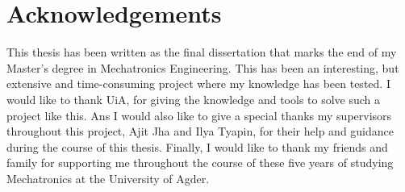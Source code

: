 \chapter*{Acknowledgements}
This thesis has been written as the final dissertation that marks the end of my Master's degree in Mechatronics Engineering. This has been an interesting, but extensive and time-consuming project where my knowledge has been tested. I would like to thank UiA, for giving the knowledge and tools to solve such a project like this. Ans I would also like to give a special thanks my supervisors throughout this project, Ajit Jha and Ilya Tyapin, for their help and guidance during the course of this thesis. Finally, I would like to thank my friends and family for supporting me throughout the course of these five years of studying Mechatronics at the University of Agder.
